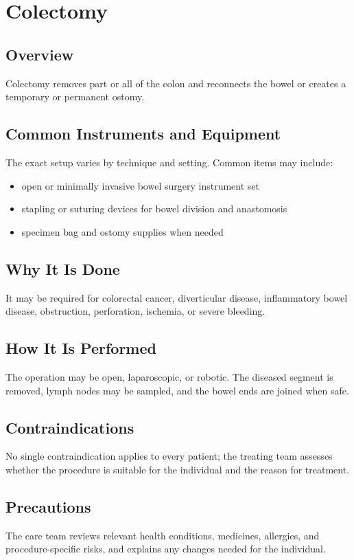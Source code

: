 \chapter{Colectomy}
\section*{Overview}
Colectomy removes part or all of the colon and reconnects the bowel or creates a temporary or permanent ostomy.
\section*{Common Instruments and Equipment}
The exact setup varies by technique and setting. Common items may include:
\begin{itemize}[nosep,leftmargin=*]
  \item open or minimally invasive bowel surgery instrument set
  \item stapling or suturing devices for bowel division and anastomosis
  \item specimen bag and ostomy supplies when needed
\end{itemize}

\section*{Why It Is Done}
It may be required for colorectal cancer, diverticular disease, inflammatory bowel disease, obstruction, perforation, ischemia, or severe bleeding.
\section*{How It Is Performed}
The operation may be open, laparoscopic, or robotic. The diseased segment is removed, lymph nodes may be sampled, and the bowel ends are joined when safe.
\section*{Contraindications}
No single contraindication applies to every patient; the treating team assesses whether the procedure is suitable for the individual and the reason for treatment.

\section*{Precautions}
The care team reviews relevant health conditions, medicines, allergies, and procedure-specific risks, and explains any changes needed for the individual.

